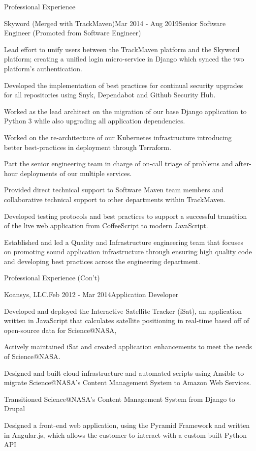 \documentclass{bluefin_cv}
\begin{document}
\begin{bfcvSection}{Professional Experience}
\begin{bfcvWorkSubsection}{Skyword (Merged with TrackMaven)}{Mar 2014 - Aug 2019}{Senior Software Engineer (Promoted from Software Engineer)}
\item Lead effort to unify users between the TrackMaven platform and the Skyword platform; creating a unified login micro-service in Django which synced the two platform's authentication.
\item Developed the implementation of best practices for continual security upgrades for all repositories using Snyk, Dependabot and Github Security Hub.
\item Worked as the lead architect on the migration of our base Django application to Python 3 while also upgrading all application dependencies.
\item Worked on the re-architecture of our Kubernetes infrastructure introducing better best-practices in deployment through Terraform.
\item Part the senior engineering team in charge of on-call triage of problems and after-hour deployments of our multiple services.
\item Provided direct technical support to Software Maven team members and collaborative technical support to other departments within TrackMaven.
\item Developed testing protocols and best practices to support a successful transition of the live web application from CoffeeScript to modern JavaScript.
\item Established and led a Quality and Infrastructure engineering team that focuses on promoting sound application infrastructure through ensuring high quality code and developing best practices across the engineering department.
\end{bfcvWorkSubsection}

\end{bfcvSection}

\begin{bfcvSection}{Professional Experience (Con't)}
\begin{bfcvWorkSubsection}{Koansys, LLC.}{Feb 2012 - Mar 2014}{Application Developer}
\item Developed and deployed the Interactive Satellite Tracker (iSat), an application written in JavaScript that calculates satellite positioning in real-time based off of open-source data for Science@NASA,
\item Actively maintained iSat and created application enhancements to meet the needs of Science@NASA.
\item Designed and built cloud infrastructure and automated scripts using Ansible to migrate Science@NASA’s Content Management System to Amazon Web Services.
\item Transitioned Science@NASA’s Content Management System from Django to Drupal
\item Designed a front-end web application, using the Pyramid Framework and written in Angular.js, which allows the customer to interact with a custom-built Python API
\end{bfcvWorkSubsection}
\end{bfcvSection}
\end{document}
